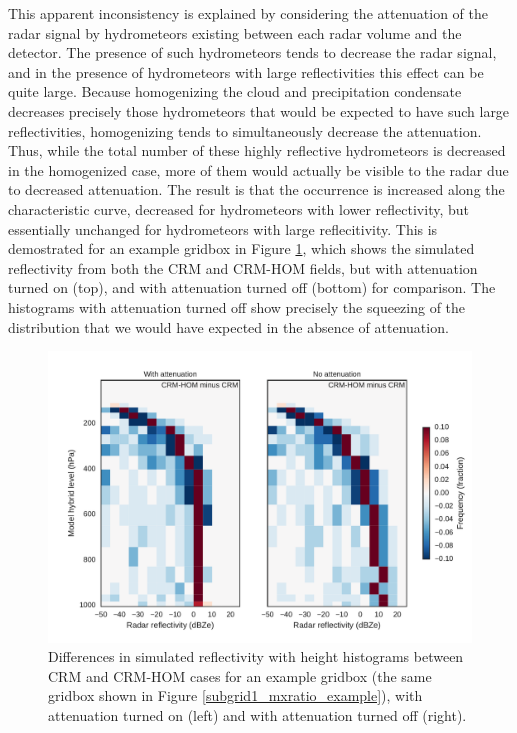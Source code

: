 This apparent inconsistency is explained by considering the attenuation of the radar signal by hydrometeors existing between each radar volume and the detector. The presence of such hydrometeors tends to decrease the radar signal, and in the presence of hydrometeors with large reflectivities this effect can be quite large. Because homogenizing the cloud and precipitation condensate decreases precisely those hydrometeors that would be expected to have such large reflectivities, homogenizing tends to simultaneously decrease the attenuation. Thus, while the total number of these highly reflective hydrometeors is decreased in the homogenized case, more of them would actually be visible to the radar due to decreased attenuation. The result is that the occurrence is increased along the characteristic curve, decreased for hydrometeors with lower reflectivity, but essentially unchanged for hydrometeors with large reflecitivity. This is demostrated for an example gridbox in Figure \ref{subgrid1_cfadDbze94_testatt}, which shows the simulated reflectivity from both the CRM and CRM-HOM fields, but with attenuation turned on (top), and with attenuation turned off (bottom) for comparison. The histograms with attenuation turned off show precisely the squeezing of the distribution that we would have expected in the absence of attenuation.

\begin{figure}
\centering
\includegraphics[width=\columnwidth]{graphics/subgrid1_cfadDbze94_att-test.pdf}
\caption{Differences in simulated reflectivity with height histograms between CRM and CRM-HOM cases for an example gridbox (the same gridbox shown in Figure \ref{subgrid1_mxratio_example}), with attenuation turned on (left) and with attenuation turned off (right).}
\label{subgrid1_cfadDbze94_testatt}
\end{figure}

